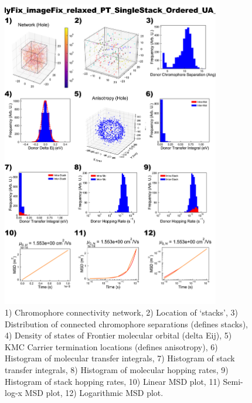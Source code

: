 \documentclass[12pt]{article}
\begin{document}
\begin{figure}[h]\centering
	\includegraphics[width=0.85\textwidth]{Figures/PT_SingleStack_Ordered.png}
    \caption{   1) Chromophore connectivity network, 
                2) Location of `stacks', 
                3) Distribution of connected chromophore separations (defines stacks),
                4) Density of states of Frontier molecular orbital (delta Eij),
                5) KMC Carrier termination locations (defines anisotropy),
                6) Histogram of molecular transfer integrals,
                7) Histogram of stack transfer integrals,
                8) Histogram of molecular hopping rates,
                9) Histogram of stack hopping rates,
                10) Linear MSD plot,
                11) Semi-log-x MSD plot,
                12) Logarithmic MSD plot.}
	\label{fig:PTSingOrd}
\end{figure}
\end{document}
